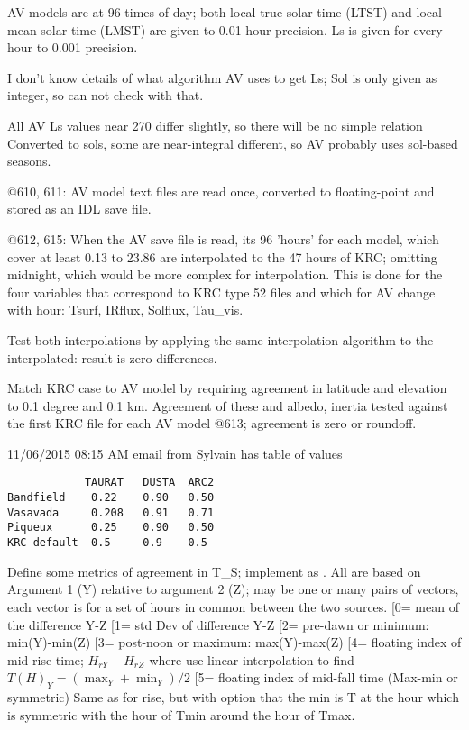 \documentclass{article}
\begin{document}
AV models are at 96 times of day; both local true solar time (LTST) and local mean solar time (LMST) are given to 0.01 hour precision. Ls is given for every hour to 0.001 precision.

I don't know details of what algorithm AV uses to get Ls; Sol is only given as integer, so can not check with that.

All AV Ls values near 270 differ slightly, so there will be no simple relation
\qi Converted to sols, some are near-integral different, so AV probably uses 
sol-based seasons.

@610, 611: AV model text files are read once, converted to floating-point and
stored as an IDL save file.

@612, 615: When the AV save file is read, its 96 'hours' for each model, which
cover at least 0.13 to 23.86 are interpolated to the 47 hours of KRC; omitting
midnight, which would be more complex for interpolation. This is done for the
four variables that correspond to KRC type 52 files and which for AV change with
hour: Tsurf, IRflux, Solflux, Tau_vis.

Test both interpolations by applying the same interpolation algorithm to the
interpolated: result is zero differences.

Match KRC case to AV model by requiring agreement in latitude and elevation to
0.1 degree and 0.1 km. Agreement of these and albedo, inertia tested
against the first KRC file for each AV model @613; agreement is zero or
roundoff.

 11/06/2015 08:15 AM email from Sylvain has table of values 
\vspace{-3.mm} 
\begin{verbatim}
            TAURAT   DUSTA  ARC2
Bandfield    0.22    0.90   0.50
Vasavada     0.208   0.91   0.71
Piqueux      0.25    0.90   0.50
KRC default  0.5     0.9    0.5
\end{verbatim}  

Define some metrics of agreement in T_S; implement as . All
are based on Argument 1 (Y) relative to argument 2 (Z); may be one or many pairs
of vectors, each vector is for a set of hours in common between the two sources.
\qi [0= mean of the difference Y-Z
\qi [1= std Dev of difference Y-Z 
\qi [2= pre-dawn or minimum:  min(Y)-min(Z) 
\qi [3= post-noon or maximum: max(Y)-max(Z)
\qi [4= floating index of mid-rise time;  $H_{rY} -H_{rZ}$ 
\qii where use linear interpolation to find $T(H)_Y = (\max_Y + \min_Y)/2$
\qi [5= floating index of mid-fall time (Max-min or symmetric)
\qii Same as for rise, but with option that the min is T at the hour which is symmetric with the hour of Tmin around the hour of Tmax.
\end{document}
